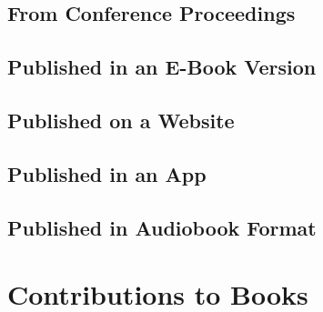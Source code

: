 \documentclass{article}
\begin{document}
\subsection{From Conference Proceedings} %
\label{sub:from_conference_proceedings}
\begin{refsection}
	\nocite{Chang:2000uv}
	\printbibliography[heading=none]
\end{refsection}
\subsection{Published in an E-Book Version} %
\label{sub:published_in_an_e_book_version}
\begin{refsection}
	\nocite{Handbook:2021aa,OConnor:2009un}
	\printbibliography[heading=none]
\end{refsection}
\subsection{Published on a Website} %
\label{sub:published_on_a_website}
\begin{refsection}
	\nocite{Gikandi:2000vz,Miller:2016vg}
	\printbibliography[heading=none]
\end{refsection}
\subsection{Published in an App} %
\label{sub:published_in_an_app}
\begin{refsection}
	\nocite{Bible-app:2016ab}
	\printbibliography[heading=none]
\end{refsection}
\subsection{Published in Audiobook Format} %
\label{sub:published_in_audiobook_format}
\begin{refsection}
	\nocite{Lee:2014vk}
	\printbibliography[heading=none]
\end{refsection}

\section{Contributions to Books} %
\label{sec:contributions_to_books}
\end{document}
